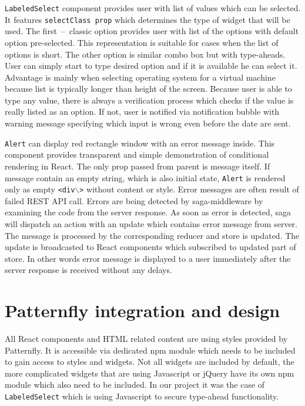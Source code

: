 \texttt{LabeledSelect} component provides user with list of values which can be selected. It features \texttt{selectClass prop} which determines the type of widget that will be used. 
The first~--~classic option provides user with list of the options with default option pre-selected. This representation is suitable for cases when the list of options is short.
The other option is similar combo box but with type-aheads. User can simply start to type desired option and if it is available he can select it. Advantage is mainly when selecting operating system for a virtual machine because list is typically longer than height of the screen. Because user is able to type any value, there is always a verification process which checks if the value is really listed as an option. If not, user is notified via notification bubble with warning message specifying which input is wrong even before the date are sent.

\texttt{Alert} can display red rectangle window with an error message inside. This component provides transparent and simple demonstration of conditional rendering in React. The only prop passed from parent is message itself. If message contain an empty string, which is also initial state, \texttt{Alert} is rendered only as empty \texttt{<div$\backslash$>} without content or style. 
Error messages are often result of failed REST API call. Errors are being detected by saga-middleware by examining the code from the server response. As soon as error is detected, saga will dispatch an action with an update which contains error message from server. The message is processed by the corresponding reducer and store is updated. The update is broadcasted to React components which subscribed to updated part of store. In other words error message is displayed to a user immediately after the server response is received without any delays. 

\section{Patternfly integration and design}
All React components and HTML related content are using styles provided by Patternfly. It is accessible via dedicated npm module which needs to be included to gain access to styles and widgets. Not all widgets are included by default, the more complicated widgets that are using Javascript or jQuery have its own npm module which also need to be included. In our project it was the case of \texttt{LabeledSelect} which is using Javascript to secure type-ahead functionality.

